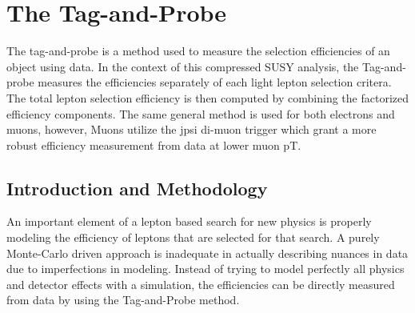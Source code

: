 
\setcounter{secnumdepth}{3}
\setcounter{tocdepth}{3}
\setlength{\parskip}{\smallskipamount}
\setlength{\parindent}{0pt}


\makeatletter


\providecommand{\tabularnewline}{\\}


\makeatother

%

\chapter{The Tag-and-Probe}

\begin{chapterabstract}
The tag-and-probe is a method used to measure the selection efficiencies of an object using data. In the context of this compressed SUSY analysis, the Tag-and-probe measures the efficiencies separately of each light lepton selection critera. The total lepton selection efficiency is then computed by combining the factorized efficiency components. The same general method is used for both electrons and muons, however, Muons utilize  the jpsi di-muon trigger which grant a more robust efficiency measurement from data at lower muon pT.
\end{chapterabstract}

\section{Introduction and Methodology}
An important element of a lepton based search for new physics is properly modeling the efficiency of leptons that are selected for that search. A purely Monte-Carlo driven approach is inadequate in actually describing nuances in data due to imperfections in modeling. Instead of trying to model perfectly all physics and detector effects with a simulation, the efficiencies can be directly measured from data by using the Tag-and-Probe method. 

